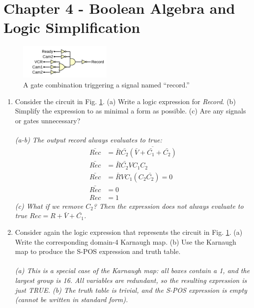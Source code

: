 \documentclass[10pt]{article}
\begin{document}
\section{Chapter 4 - Boolean Algebra and Logic Simplification}
\begin{figure}[ht]
\centering
\includegraphics[width=0.4\textwidth]{gateExample4.pdf}
\caption{\label{fig:gates2} A gate combination triggering a signal named ``record.''}
\end{figure}
\begin{enumerate}
\item Consider the circuit in Fig. \ref{fig:gates2}.  (a) Write a logic expression for \textit{Record}. (b) Simplify the expression to as minimal a form as possible. (c) Are any signals or gates unnecessary? \\ \\
\textit{(a-b) The output record always evaluates to true:}
\begin{align}
\bar{Rec} &= \bar{R}\bar{C_2}\overline{(\bar{V}+\bar{C_1}+\bar{C_2})} \\
\bar{Rec} &= \bar{R}\bar{C_2}V C_1 C_2 \\
\bar{Rec} &= \bar{R}VC_1 (C_2 \bar{C_2}) = 0 \\
\bar{Rec} &= 0 \\
Rec &= 1
\end{align}
\textit{(c) What if we remove $C_2$?  Then the expression does not always evaluate to true $Rec = R + \bar{V} + \bar{C_1}$.}
\item Consider again the logic expression that represents the circuit in Fig. \ref{fig:gates2}. (a) Write the corresponding domain-4 Karnaugh map.  (b) Use the Karnaugh map to produce the S-POS expression and truth table. \\ \\
\textit{(a) This is a special case of the Karnaugh map: all boxes contain a 1, and the largest group is 16.  All variables are redundant, so the resulting expression is just TRUE.  (b) The truth table is trivial, and the S-POS expression is empty (cannot be written in standard form).}
\end{enumerate}
\end{document}
